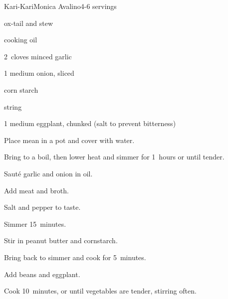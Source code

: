\begin{recipe}{Kari-Kari}{Monica Avalino}{4-6 servings}

\begin{ingredients}
\item \lbs{2 \half} ox-tail and stew 
\item {} cooking oil
\item 2~cloves minced garlic
\item 1 medium onion, sliced
\item {} 
\item {} corn starch
\item \lbs{\half} string 
\item 1 medium eggplant, chunked (salt to prevent bitterness)
\end{ingredients}

\begin{directions}
\item Place mean in a pot and cover with water.
\item Bring to a boil, then lower heat and simmer for 1\half~hours or until tender.
\item Saut\'e garlic and onion in oil.
\item Add meat and broth.
\item Salt and pepper to taste.
\item Simmer 15~minutes.
\item Stir in peanut butter and cornstarch.
\item Bring back to simmer and cook for 5~minutes.
\item Add beans and eggplant.
\item Cook 10~minutes, or until vegetables are tender, stirring often.

\end{directions}
\end{recipe}
